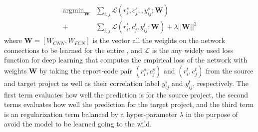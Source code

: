 







\begin{equation}
\begin{aligned}
\label{eq:lossfunction}
\mathop{\arg\min}_{\mathbf{W}}&\sum_{i,j}\mathcal{L}(r^s_i,c^s_j,,y^s_{ij}; \mathbf{W}) \\
+&\sum_{i,j}\mathcal{L}(r^t_i,c^t_j,y^t_{ij}; \mathbf{W})+\lambda||\mathbf{W}||^2
\end{aligned}
\end{equation}
%
where $\mathbf{W} = [W_{CNN}, W_{FCN}]$ is the vector all the weights on the network connections to be learned for the entire \TRANPCNN, and $\mathcal{L}$ is the any widely used loss function for deep learning that computes the empirical loss of the network with weights $\mathbf{W}$ by taking the report-code pair $(r^s_i, c^s_j)$ and $(r^t_i, c^t_j)$ from the source and target project as well as their correlation label $y^s_{ij}$ and $y^t_{ij}$, respectively. The first term evaluates how well the prediction is for the source project, the second terms evaluates how well the prediction for the target project, and the third term is an regularization term balanced by a hyper-parameter $\lambda$ in the purpose of avoid the model to be learned going to the wild.


